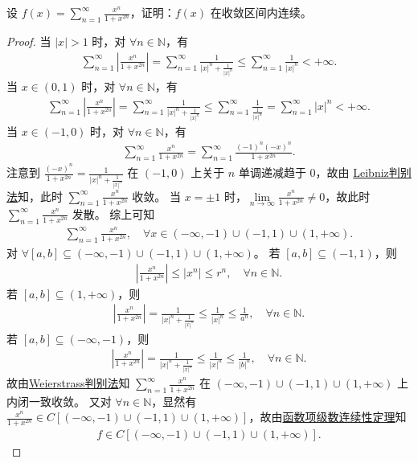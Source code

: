 \documentclass[../../main.tex]{subfiles}%
\begin{document}
\begin{example}
设 $f(x)=\sum\limits_{n=1}^{\infty}\frac{x^n}{1+x^{2n}}$，证明：$f(x)$ 在收敛区间内连续。
\end{example}
\begin{proof}
当 $|x|>1$ 时，对 $\forall n\in\mathbb{N}$，有
\begin{align*}
\sum_{n=1}^{\infty}\left|\frac{x^n}{1+x^{2n}}\right|=\sum_{n=1}^{\infty}\frac{1}{|x|^n+\frac{1}{|x|^n}}\leqslant\sum_{n=1}^{\infty}\frac{1}{|x|^n}<+\infty.
\end{align*}
当 $x\in(0,1)$ 时，对 $\forall n\in\mathbb{N}$，有
\begin{align*}
\sum_{n=1}^{\infty}\left|\frac{x^n}{1+x^{2n}}\right|=\sum_{n=1}^{\infty}\frac{1}{|x|^n+\frac{1}{|x|^n}}\leqslant\sum_{n=1}^{\infty}\frac{1}{\frac{1}{|x|^n}}=\sum_{n=1}^{\infty}|x|^n<+\infty.
\end{align*}
当 $x\in(-1,0)$ 时，对 $\forall n\in\mathbb{N}$，有
\begin{align*}
\sum_{n=1}^{\infty}\frac{x^n}{1+x^{2n}}=\sum_{n=1}^{\infty}\frac{(-1)^n(-x)^n}{1+x^{2n}}.
\end{align*}
注意到 $\frac{(-x)^n}{1+x^{2n}}=\frac{1}{|x|^n+\frac{1}{|x|^n}}$ 在 $(-1,0)$ 上关于 $n$ 单调递减趋于 $0$，故由 \hyperref[theorem:Leibniz(莱布尼兹)判别法]{Leibniz判别法}知，此时 $\sum\limits_{n=1}^{\infty}\frac{x^n}{1+x^{2n}}$ 收敛。
当 $x=\pm1$ 时，$\lim\limits_{n\to\infty}\frac{x^n}{1+x^{2n}}\neq0$，故此时 $\sum\limits_{n=1}^{\infty}\frac{x^n}{1+x^{2n}}$ 发散。
综上可知
\begin{align*}
\sum_{n=1}^{\infty}\frac{x^n}{1+x^{2n}},\quad \forall x\in(-\infty,-1)\cup(-1,1)\cup(1,+\infty).
\end{align*}
对 $\forall[a,b]\subseteq(-\infty,-1)\cup(-1,1)\cup(1,+\infty)$。
若 $[a,b]\subseteq(-1,1)$，则
\begin{align*}
\left|\frac{x^n}{1+x^{2n}}\right|\leqslant|x^n|\leqslant r^n,\quad \forall n\in\mathbb{N}.
\end{align*}
若 $[a,b]\subseteq(1,+\infty)$，则
\begin{align*}
\left|\frac{x^n}{1+x^{2n}}\right|=\frac{1}{|x|^n+\frac{1}{|x|^n}}\leqslant\frac{1}{|x|^n}\leqslant\frac{1}{a^n},\quad \forall n\in\mathbb{N}.
\end{align*}
若 $[a,b]\subseteq(-\infty,-1)$，则
\begin{align*}
\left|\frac{x^n}{1+x^{2n}}\right|=\frac{1}{|x|^n+\frac{1}{|x|^n}}\leqslant\frac{1}{|x|^n}\leqslant\frac{1}{|b|^n},\quad \forall n\in\mathbb{N}.
\end{align*}
故由\hyperref[theorem:Weierstrass(魏尔斯特拉斯)判别法]{Weierstrass判别法}知 $\sum\limits_{n=1}^{\infty}\frac{x^n}{1+x^{2n}}$ 在 $(-\infty,-1)\cup(-1,1)\cup(1,+\infty)$ 上内闭一致收敛。
又对 $\forall n\in\mathbb{N}$，显然有 $\frac{x^n}{1+x^{2n}}\in C[(-\infty,-1)\cup(-1,1)\cup(1,+\infty)]$，故由\hyperref[theorem:函数项级数连续性定理]{函数项级数连续性定理}知
\begin{align*}
f\in C[(-\infty,-1)\cup(-1,1)\cup(1,+\infty)].
\end{align*}
\end{proof}
\end{document}
